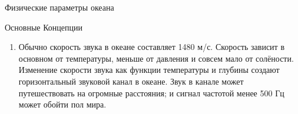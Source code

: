 \begin{chapter}{Физические параметры океана}
\begin{section}{Основные Концепции}
\begin{enumerate}
\item
Обычно скорость звука в океане составляет 1480 м/с. Скорость зависит в
основном от температуры, меньше от давления и совсем мало от
солёности. Изменение скорости звука как функции температуры и глубины
создают горизонтальный звуковой канал в океане. Звук в канале может
путешествовать на огромные расстояния; и сигнал частотой менее 500 Гц
может обойти пол мира.
%
\end{enumerate}
\end{section}

\end{chapter}
